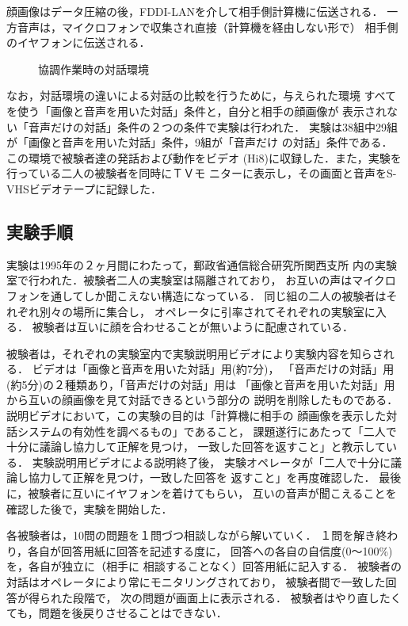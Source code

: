 顔画像はデータ圧縮の後，FDDI-LANを介して相手側計算機に伝送される．
一方音声は，マイクロフォンで収集され直接（計算機を経由しない形で）
相手側のイヤフォンに伝送される．

\begin{figure}
\vspace{-4.5mm}
\begin{center}
\end{center}
\vspace{-5mm}
\caption{協調作業時の対話環境}
\end{figure}

なお，対話環境の違いによる対話の比較を行うために，与えられた環境
すべてを使う「画像と音声を用いた対話」条件と，自分と相手の顔画像が
表示されない「音声だけの対話」条件の２つの条件で実験は行われた．
実験は38組中29組が「画像と音声を用いた対話」条件，9組が「音声だけ
の対話」条件である．
この環境で被験者達の発話および動作をビデオ
(Hi8)に収録した．また，実験を行っている二人の被験者を同時にＴＶモ
ニターに表示し，その画面と音声をS-VHSビデオテープに記録した．

\subsection{実験手順}

実験は1995年の２ヶ月間にわたって，郵政省通信総合研究所関西支所
内の実験室で行われた．被験者二人の実験室は隔離されており，
お互いの声はマイクロフォンを通してしか聞こえない構造になっている．
同じ組の二人の被験者はそれぞれ別々の場所に集合し，
オペレータに引率されてそれぞれの実験室に入る．
被験者は互いに顔を合わせることが無いように配慮されている．

被験者は，それぞれの実験室内で実験説明用ビデオにより実験内容を知らされる．
ビデオは「画像と音声を用いた対話」用(約7分)，
「音声だけの対話」用(約5分)の２種類あり，「音声だけの対話」用は
「画像と音声を用いた対話」用から互いの顔画像を見て対話できるという部分の
説明を削除したものである．
説明ビデオにおいて，この実験の目的は「計算機に相手の
顔画像を表示した対話システムの有効性を調べるもの」であること，
課題遂行にあたって「二人で十分に議論し協力して正解を見つけ，
一致した回答を返すこと」と教示している．
実験説明用ビデオによる説明終了後，
実験オペレータが「二人で十分に議論し協力して正解を見つけ，一致した回答を
返すこと」を再度確認した．
最後に，被験者に互いにイヤフォンを着けてもらい，
互いの音声が聞こえることを確認した後で，実験を開始した．

各被験者は，10問の問題を１問づつ相談しながら解いていく．
１問を解き終わり，各自が回答用紙に回答を記述する度に，
回答への各自の自信度(0〜100\%)を，各自が独立に（相手に
相談することなく）回答用紙に記入する．
被験者の対話はオペレータにより常にモニタリングされており，
被験者間で一致した回答が得られた段階で，
次の問題が画面上に表示される．
被験者はやり直したくても，問題を後戻りさせることはできない．

